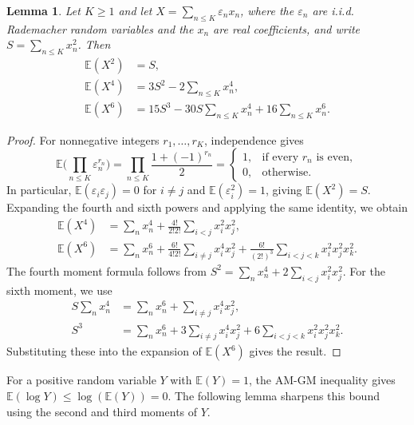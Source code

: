 \documentclass[reqno,12pt]{amsart}
\newtheorem{lemma}[theorem]{Lemma}
\theoremstyle{remark}
\newcommand{\EE}{\mathbb{E}}
\begin{document}
\begin{lemma}\label{lemma moments}
Let $K\geq 1$ and let $X = \sum_{n\leq K} \varepsilon_n x_n$, where the $\varepsilon_n$ are i.i.d. Rademacher random variables and the $x_n$ are real coefficients, and write $S=\sum_{n\leq K}x_n^2$. Then
\begin{align*}
\EE(X^2)&=S,\\
\EE(X^4)&=3S^2-2\sum_{n\leq K}x_n^4,\\
\EE(X^6)&=15S^3-30S\sum_{n\leq K}x_n^4+16\sum_{n\leq K}x_n^6.
\end{align*}
\end{lemma}
\begin{proof}
For nonnegative integers $r_1,\ldots,r_K$, independence gives
$$ \EE\bigg(\prod_{n\leq K}\varepsilon_n^{r_n}\bigg)
=\prod_{n\leq K}\frac{1+(-1)^{r_n}}{2}
=\begin{cases}
1,&\text{if every $r_n$ is even},\\
0,&\text{otherwise}.
\end{cases} $$
In particular, $\EE(\varepsilon_i\varepsilon_j)=0$ for $i\neq j$ and $\EE(\varepsilon_i^2)=1$, giving $\EE(X^2)=S$. Expanding the fourth and sixth powers and applying the same identity, we obtain
\begin{align*}
\EE(X^4)&=\sum_nx_n^4+\frac{4!}{2!2!}\sum_{i<j}x_i^2x_j^2,\\
\EE(X^6)&=\sum_nx_n^6+\frac{6!}{4!2!}\sum_{i\neq j}x_i^4x_j^2
+\frac{6!}{(2!)^3}\sum_{i<j<k}x_i^2x_j^2x_k^2.
\end{align*}
The fourth moment formula follows from $S^2=\sum_nx_n^4+2\sum_{i<j}x_i^2x_j^2$. For the sixth moment, we use
\begin{align*}
S\sum_nx_n^4&=\sum_nx_n^6+\sum_{i\neq j}x_i^4x_j^2,\\
S^3&=\sum_nx_n^6+3\sum_{i\neq j}x_i^4x_j^2
+6\sum_{i<j<k}x_i^2x_j^2x_k^2.
\end{align*}
Substituting these into the expansion of $\EE(X^6)$ gives the result.
\end{proof}

For a positive random variable $Y$ with $\EE(Y)=1$, the AM-GM inequality gives $\EE(\log Y) \leq \log(\EE(Y))=0$. The following lemma sharpens this bound using the second and third moments of $Y$.
\end{document}
